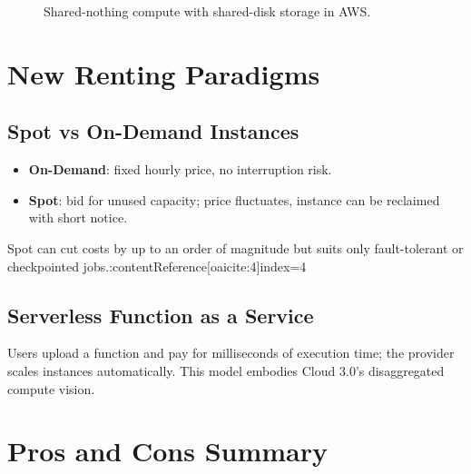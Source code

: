 \documentclass[11pt]{article}
\begin{document}
\begin{figure}[h]
  \centering
  \caption{Shared-nothing compute with shared-disk storage in AWS.}
\end{figure}

\section{New Renting Paradigms}

\subsection{Spot vs On-Demand Instances}

\begin{itemize}[itemsep=0pt]
  \item \textbf{On-Demand}: fixed hourly price, no interruption risk.
  \item \textbf{Spot}: bid for unused capacity; price fluctuates, instance can be reclaimed with short notice.
\end{itemize}

Spot can cut costs by up to an order of magnitude but suits only fault-tolerant or checkpointed jobs.:contentReference[oaicite:4]{index=4}

\subsection{Serverless Function as a Service}

Users upload a function and pay for milliseconds of execution time; the provider scales instances automatically.  This model embodies Cloud 3.0’s disaggregated compute vision.

\section{Pros and Cons Summary}
\end{document}
